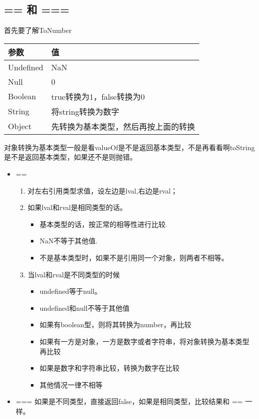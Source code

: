 \subsection{== 和 ===}

首先要了解ToNumber

\begin{tabular}{|l|l|}
\hline
参数 & 值 \\
\hline
Undefined & NaN \\
\hline
Null & 0 \\
\hline
Boolean & true转换为1，false转换为0 \\
\hline
String & 将string转换为数字 \\
\hline
Object & 先转换为基本类型，然后再按上面的转换 \\
\hline
\end{tabular}

对象转换为基本类型一般是看valueOf是不是返回基本类型，不是再看看啊toString是不是返回基本类型，如果还不是则抛错。

\begin{itemize}
\item == 

\begin{enumerate}
\item 对左右引用类型求值，设左边是lval,右边是rval；
\item 如果lval和rval是相同类型的话。
	\begin{itemize}
	\item 基本类型的话，按正常的相等性进行比较.
	\item NaN不等于其他值.
	\item 不是基本类型时，如果不是引用同一个对象，则两者不相等。
	\end{itemize}
\item 当lval和rval是不同类型的时候
	\begin{itemize}
	\item undefined等于null。
	\item undefined和null不等于其他值
	\item 如果有boolean型，则将其转换为number，再比较
	\item 如果有一方是对象，一方是数字或者字符串，将对象转换为基本类型再比较
	\item 如果是数字和字符串比较，转换为数字在比较
	\item 其他情况一律不相等
	\end{itemize}
\end{enumerate}

\item ===
如果是不同类型，直接返回false，如果是相同类型，比较结果和 == 一样。
\end{itemize}

